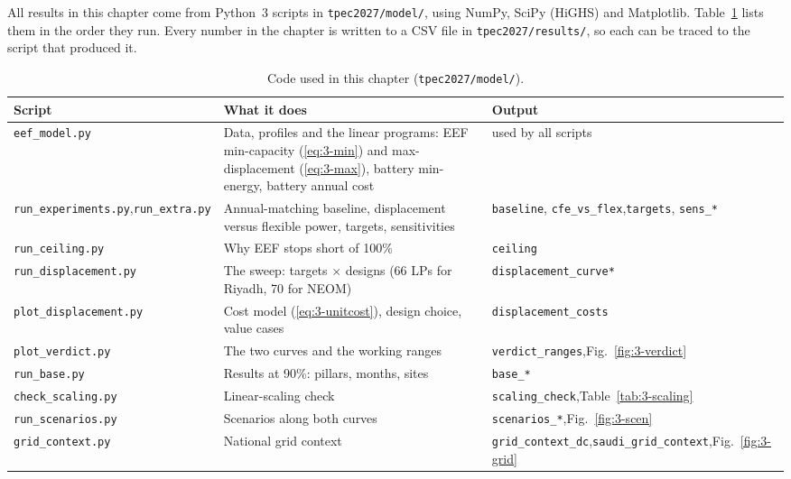 All results in this chapter come from Python~3 scripts in \texttt{tpec2027/model/}, using NumPy, SciPy (HiGHS) and Matplotlib. Table~\ref{tab:3-code} lists them in the order they run. Every number in the chapter is written to a CSV file in \texttt{tpec2027/results/}, so each can be traced to the script that produced it.

\begin{table}[!htbp]
\centering
\caption{Code used in this chapter (\texttt{tpec2027/model/}).}
\label{tab:3-code}
\small
\renewcommand{\arraystretch}{1.15}
\begin{tabularx}{\textwidth}{>{\raggedright\arraybackslash}p{4.1cm}>{\raggedright\arraybackslash}X>{\raggedright\arraybackslash}p{4.1cm}}
\toprule
\textbf{Script} & \textbf{What it does} & \textbf{Output} \\
\midrule
\texttt{eef\_model.py} & Data, profiles and the linear programs: EEF min-capacity (\ref{eq:3-min}) and max-displacement (\ref{eq:3-max}), battery min-energy, battery annual cost & used by all scripts \\
\texttt{run\_experiments.py},\newline \texttt{run\_extra.py} & Annual-matching baseline, displacement versus flexible power, targets, sensitivities & \texttt{baseline}, \texttt{cfe\_vs\_flex},\newline \texttt{targets}, \texttt{sens\_*} \\
\texttt{run\_ceiling.py} & Why EEF stops short of 100\% & \texttt{ceiling} \\
\texttt{run\_displacement.py} & The sweep: targets $\times$ designs (66 LPs for Riyadh, 70 for NEOM) & \texttt{displacement\_curve*} \\
\texttt{plot\_displacement.py} & Cost model (\ref{eq:3-unitcost}), design choice, value cases & \texttt{displacement\_costs} \\
\texttt{plot\_verdict.py} & The two curves and the working ranges & \texttt{verdict\_ranges},\newline Fig.~\ref{fig:3-verdict} \\
\texttt{run\_base.py} & Results at 90\%: pillars, months, sites & \texttt{base\_*} \\
\texttt{check\_scaling.py} & Linear-scaling check & \texttt{scaling\_check},\newline Table~\ref{tab:3-scaling} \\
\texttt{run\_scenarios.py} & Scenarios along both curves & \texttt{scenarios\_*},\newline Fig.~\ref{fig:3-scen} \\
\texttt{grid\_context.py} & National grid context & \texttt{grid\_context\_dc},\newline \texttt{saudi\_grid\_context},\newline Fig.~\ref{fig:3-grid} \\
\bottomrule
\end{tabularx}
\end{table}

